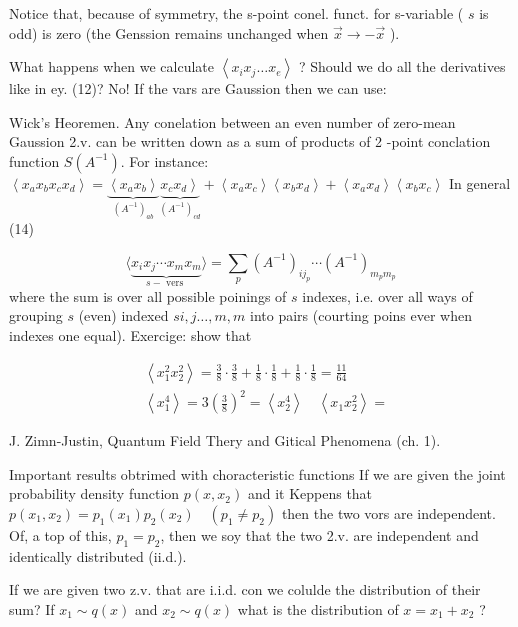 Notice that, because of symmetry, the s-point conel. funct. for s-variable ( $s$ is odd) is zero (the Genssion remains unchanged when $\vec{x} \rightarrow-\vec{x}$ ).

What happens when we calculate $\left\langle x_{i} x_{j} \ldots x_{e}\right\rangle$ ?
Should we do all the derivatives like in ey. (12)? No!
If the vars are Gaussion then we can use:

Wick's Heoremen. Any conelation between an even number of zero-mean Gaussion 2.v. can be written down as a sum of products of 2 -point conclation function $S\left(A^{-1}\right)$.
For instance:
$\left\langle x_{a} x_{b} x_{c} x_{d}\right\rangle=\underbrace{\left\langle x_{a} x_{b}\right\rangle}_{\left(A^{-1}\right)_{a b}} \underbrace{\left.x_{c} x_{d}\right\rangle}_{\left(A^{-1}\right)_{c d}}+\left\langle x_{a} x_{c}\right\rangle\left\langle x_{b} x_{d}\right\rangle+\left\langle x_{a} x_{d}\right\rangle\left\langle x_{b} x_{c}\right\rangle$
In general
(14)

$$ 
\langle\underbrace{x_{i} x_{j} \cdots x_{m} x_{m}}_{s-\text { vers }}\rangle=\sum_{p}\left(A^{-1}\right)_{i j_{p}} \cdots\left(A^{-1}\right)_{m_{p} m_{p}}
$$ 
where the sum is over all possible poinings of $s$ indexes, i.e. over all ways of grouping $s$ (even) indexed $s i, j \ldots, m, m$ into pairs (courting poins ever when indexes one equal).
Exercige: show that

$$ 
\begin{aligned}
& \left\langle x_{1}^{2} x_{2}^{2}\right\rangle=\frac{3}{8} \cdot \frac{3}{8}+\frac{1}{8} \cdot \frac{1}{8}+\frac{1}{8} \cdot \frac{1}{8}=\frac{11}{64} \\ 
& \left\langle x_{1}^{4}\right\rangle=3\left(\frac{3}{8}\right)^{2}=\left\langle x_{2}^{4}\right\rangle \quad\left\langle x_{1} x_{2}^{2}\right\rangle=
\end{aligned}
$$ 

J. Zimn-Justin, Quantum Field Thery and Gitical Phenomena
(ch. 1).

Important results obtrimed with choracteristic functions
If we are given the joint probability density function $p
(x, x_{2})$ and it Keppens that $p
(x_{1}, x_{2})=p_{1}
(x_{1}) p_{2}
(x_{2}) \quad\left(p_{1} \neq p_{2}\right)$ then the two vors are independent. Of, a top of this, $p_{1}=p_{2}$, then we soy that the two 2.v. are independent and identically distributed (ii.d.).

If we are given two z.v. that are i.i.d. con we colulde the distribution of their sum?
If $x_{1} \sim q(x)$ and $x_{2} \sim q(x)$ what is the distribution of $x=x_{1}+x_{2}$ ?